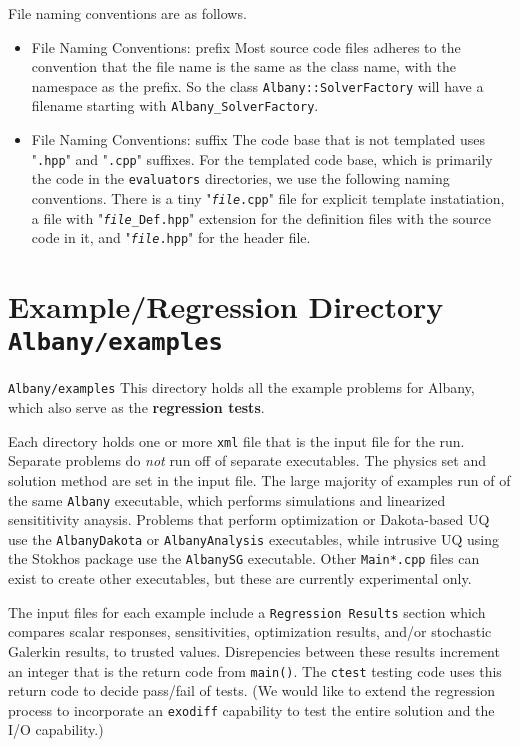 \documentclass[pdf,12pt,report,strict]{SANDreport}
\theoremstyle{remark}
\begin{document}
File naming conventions are as follows.
\begin{itemize}
\item{File Naming Conventions: prefix} Most source code files adheres to the 
convention that the file name is the same as the class name, with the namespace
as the prefix. So the class \texttt{Albany::SolverFactory} will have a filename
starting with \texttt{Albany\_SolverFactory}.

\item{File Naming Conventions: suffix} The code base that is not templated uses
"\texttt{.hpp}" and "\texttt{.cpp}" suffixes. For the templated code base, which is primarily the
code in the \texttt{evaluators} directories, we use the following naming conventions.
There is a tiny "\texttt{{\em file}.cpp}" file for
explicit template instatiation, a file with "\texttt{{\em file}\_Def.hpp}" extension
for the definition files with the source code in it, and "\texttt{{\em file}.hpp}" for
the header file.

\end{itemize}

\section{Example/Regression Directory \texttt{Albany/examples} }
\texttt{Albany/examples} This directory holds all the example problems for Albany, which 
also serve as the \textbf{regression tests}. 

Each directory holds one or more \texttt{xml} file that is
the input file for the run. Separate problems do {\em not} run off of separate executables. 
The physics set and solution method are set in the input file. The
large majority of examples run of of the same \texttt{Albany} executable, which performs simulations and
linearized sensititivity anaysis. Problems that perform optimization or Dakota-based UQ 
use the \texttt{AlbanyDakota} or \texttt{AlbanyAnalysis} executables, while intrusive UQ
using the Stokhos package use the \texttt{AlbanySG} executable. Other \texttt{Main*.cpp} files
can exist to create other executables, but these are currently experimental only.

The input files for each example include a \texttt{Regression Results} section which 
compares scalar responses, sensitivities, optimization results, and/or stochastic Galerkin
results, to trusted values. Disrepencies between these results increment an integer that
is the return code from \texttt{main()}. The \texttt{ctest} testing code uses this return
code to decide pass/fail of tests. (We would like to extend the regression process to
incorporate an \texttt{exodiff} capability to test the entire solution and the I/O 
capability.)
\end{document}
